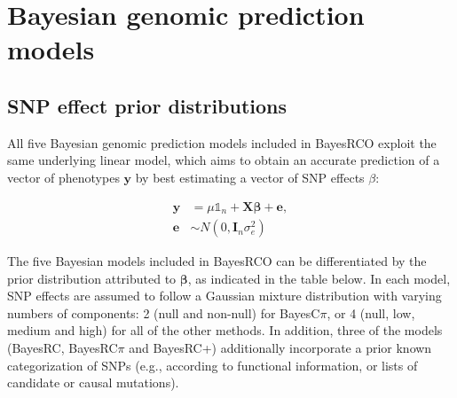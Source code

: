 \documentclass{ol-softwaremanual}
\begin{document}
\section{Bayesian genomic prediction models}

\subsection{SNP effect prior distributions}

All five Bayesian genomic prediction models included in BayesRCO exploit the same underlying linear model, which aims to obtain an accurate prediction of a vector of phenotypes $\mathbf{y}$ by best estimating a vector of SNP effects $\beta$: 

\begin{align*}
\mathbf{y}&=\mu \mathds{1}_n+\mathbf{X}\boldsymbol{\beta}+{\mathbf{e}}, \\
{\mathbf{e}} &\sim N(0,\mathbf{I}_n\sigma^2_e) \nonumber
\end{align*}

\noindent The five Bayesian models included in BayesRCO can be differentiated by the prior distribution attributed to $\boldsymbol{\beta}$, as indicated in the table below. In each model, SNP effects are assumed to follow a Gaussian mixture distribution with varying numbers of components: 2 (null and non-null) for BayesC$\pi$, or 4 (null, low, medium and high) for all of the other methods. In addition, three of the models (BayesRC, BayesRC$\pi$ and BayesRC+) additionally incorporate a prior known categorization of SNPs (e.g., according to functional information, or lists of candidate or causal mutations).

\begin{table}[h]
\end{table}
\end{document}
